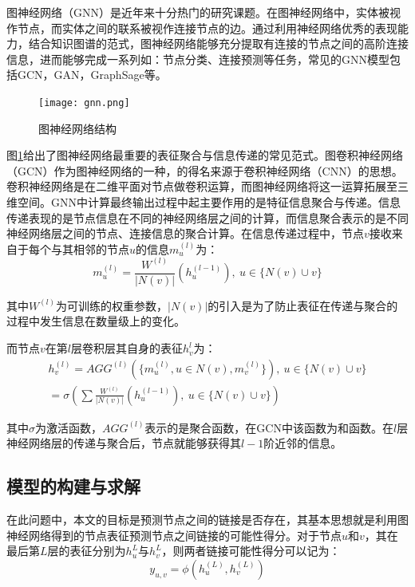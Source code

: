 \documentclass[bwprint]{gmcmthesis}
\begin{document}
图神经网络（GNN）是近年来十分热门的研究课题。在图神经网络中，实体被视作节点，而实体之间的联系被视作连接节点的边。通过利用神经网络优秀的表现能力，结合知识图谱的范式，图神经网络能够充分提取有连接的节点之间的高阶连接信息，进而能够完成一系列如：节点分类、连接预测等任务，常见的GNN模型包括GCN\cite{kipf_gcn_2017}，GAN\cite{peter_gan_2017}，GraphSage\cite{hamilton_graphsage_2017}等。

\begin{figure}[!h]
\centering
\texttt{[image: gnn.png]}
\caption{图神经网络结构}
\label{gnn}
\end{figure}


图\ref{gnn}给出了图神经网络最重要的表征聚合与信息传递的常见范式。图卷积神经网络（GCN）作为图神经网络的一种，的得名来源于卷积神经网络（CNN）的思想。卷积神经网络是在二维平面对节点做卷积运算，而图神经网络将这一运算拓展至三维空间。GNN中计算最终输出过程中起主要作用的是特征信息聚合与传递。信息传递表现的是节点信息在不同的神经网络层之间的计算，而信息聚合表示的是不同神经网络层之间的节点、连接信息的聚合计算。在信息传递过程中，节点$v$接收来自于每个与其相邻的节点$u$的信息$m_{u}^{(l)}$为：
\begin{equation}
  m_{u}^{(l)} = \frac{W^{(l)}}{|N(v)|}(h_u^{(l-1)}), \ u \in \{N(v) \cup v\}
\end{equation}

其中$W^{(l)}$为可训练的权重参数，$|N(v)|$的引入是为了防止表征在传递与聚合的过程中发生信息在数量级上的变化。

而节点$v$在第$l$层卷积层其自身的表征$h_v^{l}$为：
\begin{gather}
	h_{v}^{(l)} = AGG^{(l)}(\{m_u^{(l)}, u \in N(v), m_v^{(l)}\}), \ u \in \{N(v) \cup v\} \\ 
	= \sigma(\sum \frac{W^{(l)}}{|N(v)|}(h_u^{(l-1)}), \ u \in \{N(v) \cup v\})
\end{gather}

其中$\sigma$为激活函数，$AGG^{(l)}$表示的是聚合函数，在GCN中该函数为和函数。在$l$层神经网络层的传递与聚合后，节点就能够获得其$l-1$阶近邻的信息。

\subsection{模型的构建与求解}

在此问题中，本文的目标是预测节点之间的链接是否存在，其基本思想就是利用图神经网络得到的节点表征预测节点之间链接的可能性得分。对于节点$u$和$v$，其在最后第$L$层的表征分别为$h_u^{L}$与$h_v^{L}$，则两者链接可能性得分可以记为：
\begin{equation}
	y_{u, v} = \phi(h_u^{(L)}, h_v^{(L)})
\end{equation}
\end{document}
